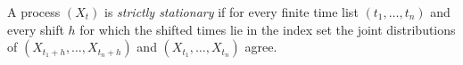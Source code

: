 
A process $(X_t)$ is \emph{strictly stationary} if for every finite time list $(t_1,\ldots,t_n)$ and every shift $h$ for which the shifted times lie in the index set the joint distributions of $(X_{t_1+h},\ldots,X_{t_n+h})$ and $(X_{t_1},\ldots,X_{t_n})$ agree.
